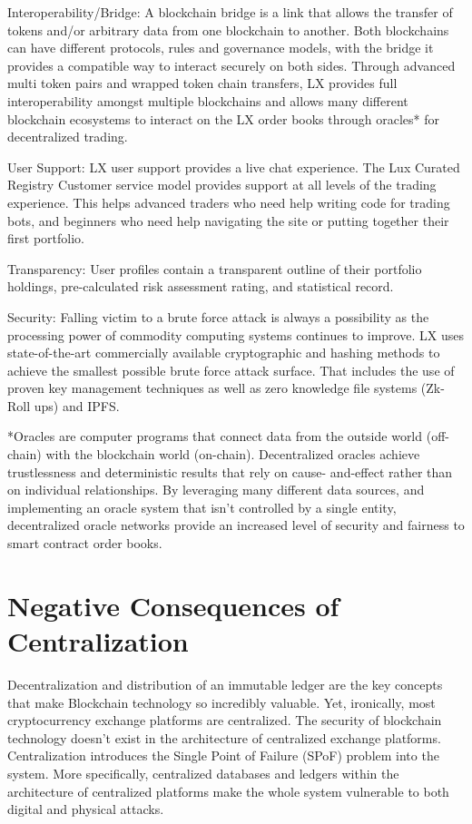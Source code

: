 \documentclass[11pt]{article}
\begin{document}
Interoperability/Bridge: A blockchain bridge is a link that allows the transfer of tokens and/or arbitrary data from one blockchain to another. Both blockchains can have different protocols, rules and governance models, with the bridge it provides a compatible way to interact securely on both sides. Through advanced multi token pairs and wrapped token chain transfers, LX provides full interoperability amongst multiple blockchains and allows many different blockchain ecosystems to interact on the LX order books through oracles* for decentralized trading.


User Support: LX user support provides a live chat experience. The Lux Curated Registry Customer service model provides support at all levels of the trading experience. This helps advanced traders who need help writing code for trading bots, and beginners who need help navigating the site or putting together their first portfolio.


Transparency: User profiles contain a transparent outline of their portfolio holdings, pre-calculated risk assessment rating, and statistical record.


Security: Falling victim to a brute force attack is always a possibility as the processing power of commodity computing systems continues to improve. LX uses state-of-the-art commercially available cryptographic and hashing methods to achieve the smallest possible brute force attack surface. That includes the use of proven key management techniques as well as zero knowledge file systems (Zk-Roll ups) and IPFS.


*Oracles are computer programs that connect data from the outside world (off-chain) with the blockchain world (on-chain). Decentralized oracles achieve trustlessness and deterministic results that rely on cause- and-effect rather than on individual relationships. By leveraging many different data sources, and implementing an oracle system that isn't controlled by a single entity, decentralized oracle networks provide an increased level of security and fairness to smart contract order books.


\section{Negative Consequences of Centralization}

Decentralization and distribution of an immutable ledger are the key concepts that make Blockchain technology so incredibly valuable. Yet, ironically, most cryptocurrency exchange platforms are centralized. The security of blockchain technology doesn't exist in the architecture of centralized exchange platforms. Centralization introduces the Single Point of Failure (SPoF) problem into the system. More specifically, centralized databases and ledgers within the architecture of centralized platforms make the whole system vulnerable to both digital and physical attacks.
\end{document}
